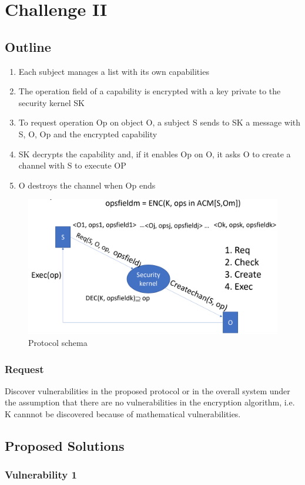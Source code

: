 \chapter{Challenge II}
\section{Outline}
\begin{enumerate}
   \item Each subject manages a list with its own capabilities
   
   \item The operation field of a capability is encrypted with a key private to the security kernel SK
   
   \item To request operation Op on object O, a subject S sends to SK a message with S, O, Op and the encrypted capability
   
   \item SK decrypts the capability and, if it enables Op on O, it asks O to create a channel with S to execute OP
   
   \item O destroys the channel when Op ends
\end{enumerate}

\begin{figure}[htbp]
   \centering
   \includegraphics{images/challenge_2.png}
   \caption{Protocol schema}
   \label{fig:challenge_2}
\end{figure}

\subsection{Request}
Discover vulnerabilities in the proposed protocol or in the overall system under the assumption that there are no vulnerabilities in the encryption algorithm,
i.e. K cannnot be discovered because of  mathematical vulnerabilities.

\section{Proposed Solutions}
\subsection{Vulnerability 1}
